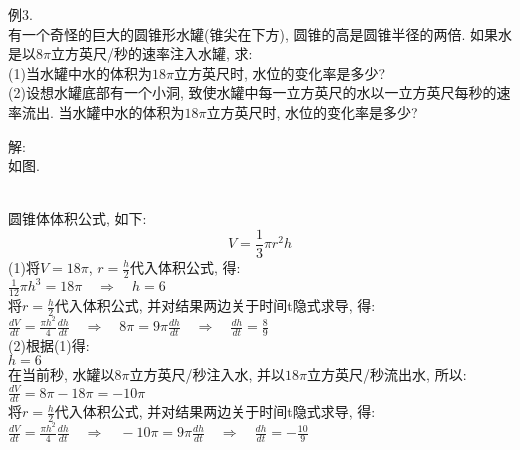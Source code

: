 例3.\\
有一个奇怪的巨大的圆锥形水罐(锥尖在下方), 圆锥的高是圆锥半径的两倍. 如果水是以$8\pi$立方英尺/秒的速率注入水罐, 求:\\
(1)当水罐中水的体积为$18\pi$立方英尺时, 水位的变化率是多少?\\
(2)设想水罐底部有一个小洞, 致使水罐中每一立方英尺的水以一立方英尺每秒的速率流出. 当水罐中水的体积为$18\pi$立方英尺时, 水位的变化率是多少?

解:\\
如图.\\
\\
圆锥体体积公式, 如下:
\[V=\frac{1}{3}\pi r^2h\]
(1)将$V=18\pi$, $r=\frac{h}{2}$代入体积公式, 得:\\[1ex]
\phantom{(1)}$\displaystyle\frac{1}{12}\pi h^3=18\pi\quad\Rightarrow\quad h=6$\\[1ex]
\phantom{(1)}将$r=\frac{h}{2}$代入体积公式, 并对结果两边关于时间t隐式求导, 得:\\[1ex]
\phantom{(1)}$\displaystyle\frac{dV}{dt}=\frac{\pi h^2}{4}\frac{dh}{dt}\quad\Rightarrow\quad 8\pi=9\pi\frac{dh}{dt}\quad\Rightarrow\quad\frac{dh}{dt}=\frac{8}{9}$\\[1ex]
(2)根据(1)得:\\
\phantom{(2)}$h=6$\\
\phantom{(2)}在当前秒, 水罐以$8\pi$立方英尺/秒注入水, 并以$18\pi$立方英尺/秒流出水, 所以:\\[1ex]
\phantom{(2)}$\displaystyle\frac{dV}{dt}=8\pi-18\pi=-10\pi$\\[1ex]
\phantom{(2)}将$r=\frac{h}{2}$代入体积公式, 并对结果两边关于时间t隐式求导, 得:\\[1ex]
\phantom{(2)}$\displaystyle\frac{dV}{dt}=\frac{\pi h^2}{4}\frac{dh}{dt}\quad\Rightarrow\quad -10\pi=9\pi\frac{dh}{dt}\quad\Rightarrow\quad\frac{dh}{dt}=-\frac{10}{9}$\\[2ex]

